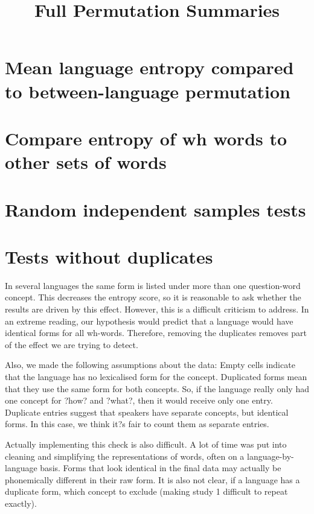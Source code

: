 \documentclass[10pt,a4paper,landscape]{article}
\title{Full Permutation Summaries}
\author{}
\date{} %
\begin{document}
\maketitle

\section{Mean language entropy compared to between-language permutation}


\clearpage
\newpage
\section{Compare entropy of wh words to other sets of words}



\clearpage
\newpage

\section{Random independent samples tests}





\clearpage
\newpage
\section{Tests without duplicates}

In several languages the same form is listed under more than one question-word concept.  This decreases the entropy score, so it is reasonable to ask whether the results are driven by this effect.  However, this is a difficult criticism to address.  In an extreme reading, our hypothesis would predict that a language would have identical forms for all wh-words.  Therefore, removing the duplicates removes part of the effect we are trying to detect.  

Also, we made the following assumptions about the data: Empty cells indicate that the language has no lexicalised form for the concept.  Duplicated forms mean that they use the same form for both concepts.  So, if the language really only had one concept for ?how? and ?what?, then it would receive only one entry.  Duplicate entries suggest that speakers have separate concepts, but identical forms.  In this case, we think it?s fair to count them as separate entries.

Actually implementing this check is also difficult.  A lot of time was put into cleaning and simplifying the representations of words, often on a language-by-language basis.  Forms that look identical in the final data may actually be phonemically different in their raw form.  It is also not clear, if a language has a duplicate form, which concept to exclude (making study 1 difficult to repeat exactly).
\end{document}
